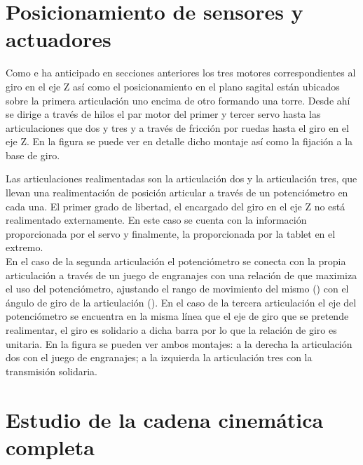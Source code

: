 \section{Posicionamiento de sensores y actuadores} \label{sec:Mecanica:sensores_actuadore}

	Como e ha anticipado en secciones anteriores los tres motores correspondientes al giro en el eje Z así como el posicionamiento en el plano sagital están ubicados sobre la primera articulación uno encima de otro formando una torre. Desde ahí se dirige a través de hilos el par motor del primer y tercer servo hasta las articulaciones que dos y tres y a través de fricción por ruedas hasta el giro en el eje Z. En la figura \completar se puede ver en detalle dicho montaje así como la fijación a la base de giro.
	\\ 
	
	
	Las articulaciones realimentadas son la articulación dos y la articulación tres, que llevan una realimentación de posición articular a través de un potenciómetro en cada una. El primer grado de libertad, el encargado del giro en el eje Z no está realimentado externamente. En este caso se cuenta con la información proporcionada por el servo y finalmente, la proporcionada por la tablet en el extremo.
	\\
	
	En el caso de la segunda articulación el potenciómetro se conecta con la propia articulación a través de un juego de engranajes con una relación de \completar que maximiza el uso del potenciómetro, ajustando el rango de movimiento del mismo () con el ángulo de giro de la articulación (). En el caso de la tercera articulación el eje del potenciómetro se encuentra en la misma línea que el eje de giro que se pretende realimentar, el giro es solidario a dicha barra por lo que la relación de giro es unitaria. En la figura \completar se pueden ver ambos montajes: a la derecha la articulación dos con el juego de engranajes; a la izquierda la articulación tres con la transmisión solidaria.
	

\section{Estudio de la cadena cinemática completa} \label{sec:Mecanica:cadena_cinematica}

